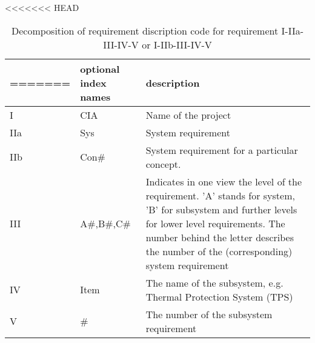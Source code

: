 \begin{table}[H]
<<<<<<< HEAD
    \caption {Decomposition of requirement discription code}
    \begin{tabular}{|p{}|p{}|p{}|}
=======
    \caption {Decomposition of requirement discription code for requirement I-IIa-III-IV-V or I-IIb-III-IV-V}
    \begin{tabular}{|p{}|p{}|p{}|}
>>>>>>> 4c1f74609f9ad04402f0c5cb47f5a2ebb09c2301
    \hline
    index number & optional index names    & description                                                                                                                                  \\ \hline \hline
    I            & CIA                     & Name of the project                                                                                                                           \\ \hline
    IIa           & Sys                     & System requirement                                                                                                                           \\ \hline
    IIb            & Con\#                    & System requirement for a particular concept.
\\ \hline
    III            & A\#,B\#,C\#                & Indicates in one view the level of the requirement. 'A' stands for system, 'B' for subsystem  and further levels for lower level requirements. The number behind the letter describes the number of the (corresponding) system requirement
\\ \hline
    IV            & Item                    & The name of the subsystem, e.g. Thermal Protection System (TPS)                                                                                                 \\ \hline
    V            & \#			           & The number of the subsystem requirement                                                                                                      \\ \hline
    \end{tabular}
    \label{tab:description}
\end{table}

